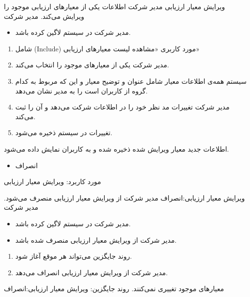\usecase
{
ویرایش معیار ارزیابی
}
{}
{
مدیر شرکت اطلاعات یکی از معیارهای ارزیابی موجود را ویرایش می‌کند.
}
{
	مدیر شرکت
}
{}
{
	\begin{itemize}
	\vspace*{-0.6cm}
	\item 
	مدیر شرکت در سیستم لاگین کرده باشد.
\end{itemize}
}
{
	\vspace*{-0.6cm}
	\begin{enumerate}
		\item 
		شامل (Include) مورد کاربری «مشاهده لیست معیارهای ارزیابی»
		\item
		مدیر شرکت یکی از معیارهای موجود را انتخاب می‌کند.
		\item 
		سیستم همه‌ی اطلاعات معیار شامل عنوان و توضیح معیار و این که مربوط به کدام گروه از کاربران است را به مدیر نشان می‌دهد.
		\item 
		مدیر شرکت تغییرات مد نظر خود را در اطلاعات شرکت می‌دهد و آن را ثبت می‌کند.
		\item 
		تغییرات در سیستم ذخیره می‌شود.
	\end{enumerate}
}
{
اطلاعات جدید معیار ویرایش شده ذخیره شده و به کاربران نمایش داده می‌شود.
}
{
	\begin{itemize}
		\vspace*{-0.6cm}
		\item 
		انصراف
	\end{itemize}
}
{
	مورد کاربرد: ویرایش معیار ارزیابی
}




\alternativeflow
{
ویرایش معیار ارزیابی:انصراف
}
{}
{
	مدیر شرکت از ویرایش معیار ارزیابی منصرف می‌شود.
}
{
	مدیر شرکت
}
{}
{
	\begin{itemize}
		\vspace*{-0.6cm}
		\item 
		مدیر شرکت در سیستم لاگین کرده باشد.
		\item
		مدیر شرکت از ویرایش معیار ارزیابی منصرف شده باشد.
	\end{itemize}
}
{
	\vspace*{-0.6cm}
	\begin{enumerate}
		\item 
		روند جایگزین می‌تواند هر موقع آغاز شود.
		\item
		مدیر شرکت از ویرایش معیار ارزیابی انصراف می‌دهد.
	\end{enumerate}
}
{
	معیارهای موجود تغییری نمی‌کنند.
}
{
	روند جایگزین: ویرایش معیار ارزیابی:انصراف
}

